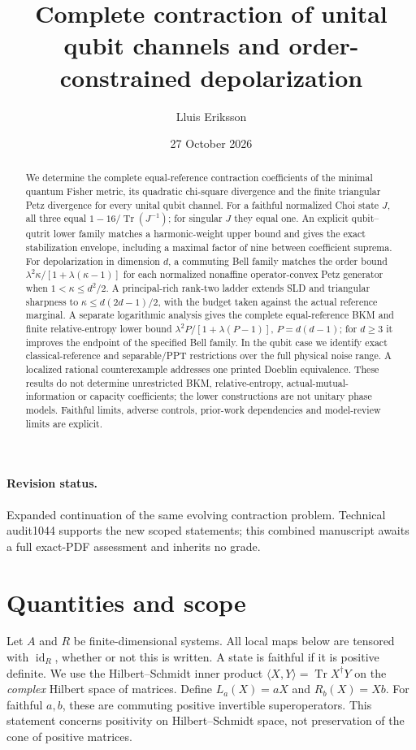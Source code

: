 \documentclass[11pt]{article}
\title{Complete contraction of unital qubit channels and order-constrained depolarization}
\author{Lluis Eriksson}
\date{27 October 2026}
\newcommand{\Tr}{\operatorname{Tr}}
\newcommand{\id}{\operatorname{id}}
\newcommand{\ip}[2]{\langle #1,#2\rangle}
\theoremstyle{remark}
\begin{document}
\maketitle
\begin{abstract}
We determine the complete equal-reference contraction coefficients of the minimal quantum Fisher metric, its quadratic chi-square divergence and the finite triangular Petz divergence for every unital qubit channel. For a faithful normalized Choi state $J$, all three equal $1-16/\Tr(J^{-1})$; for singular $J$ they equal one. An explicit qubit--qutrit lower family matches a harmonic-weight upper bound and gives the exact stabilization envelope, including a maximal factor of nine between coefficient suprema. For depolarization in dimension $d$, a commuting Bell family matches the order bound $\lambda^2\kappa/[1+\lambda(\kappa-1)]$ for each normalized nonaffine operator-convex Petz generator when $1<\kappa\le d^2/2$. A principal-rich rank-two ladder extends SLD and triangular sharpness to $\kappa\le d(2d-1)/2$, with the budget taken against the actual reference marginal. A separate logarithmic analysis gives the complete equal-reference BKM and finite relative-entropy lower bound $\lambda^2P/[1+\lambda(P-1)]$, $P=d(d-1)$; for $d\ge3$ it improves the endpoint of the specified Bell family. In the qubit case we identify exact classical-reference and separable/PPT restrictions over the full physical noise range. A localized rational counterexample addresses one printed Doeblin equivalence. These results do not determine unrestricted BKM, relative-entropy, actual-mutual-information or capacity coefficients; the lower constructions are not unitary phase models. Faithful limits, adverse controls, prior-work dependencies and model-review limits are explicit.
\end{abstract}
\paragraph{Revision status.} Expanded continuation of the same evolving contraction problem. Technical audit1044 supports the new scoped statements; this combined manuscript awaits a full exact-PDF assessment and inherits no grade.

\section{Quantities and scope}
Let \(A\) and \(R\) be finite-dimensional systems. All local maps below are tensored with \(\id_R\), whether or not this is written. A state is faithful if it is positive definite. We use the Hilbert--Schmidt inner product
\(\ip{X}{Y}=\Tr X^\dagger Y\) on the \emph{complex} Hilbert space of matrices. Define
\(L_a(X)=aX\) and \(R_b(X)=Xb\).
For faithful \(a,b\), these are commuting positive invertible superoperators. This statement concerns positivity on Hilbert--Schmidt space, not preservation of the cone of positive matrices.
\end{document}
